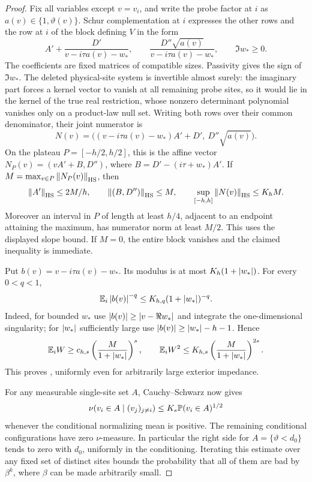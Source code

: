 \begin{proof}
Fix all variables except \(v=v_i\), and write the probe factor at \(i\)
as \(a(v)\in\{1,\vartheta(v)\}\). Schur complementation at \(i\)
expresses the other rows and the row at \(i\) of the block defining \(V\)
in the form
\[
 A'+\frac{D'}{v-i\tau a(v)-w_*},\qquad
 \frac{D''\sqrt{a(v)}}{v-i\tau a(v)-w_*},\qquad \Im w_*\ge0.
\]
The coefficients are fixed matrices of compatible sizes. Passivity
gives the sign of \(\Im w_*\). The deleted physical-site system is
invertible almost surely: the imaginary part forces a kernel vector to
vanish at all remaining probe sites, so it would lie in the kernel of
the true real restriction, whose nonzero determinant polynomial
vanishes only on a product-law null set.
Writing both rows over their common denominator, their joint numerator is
\[
 N(v)=\bigl((v-i\tau a(v)-w_*)A'+D',\ D''\sqrt{a(v)}\bigr).
\]
On the plateau \(P=[-h/2,h/2]\), this is the affine vector
\(N_P(v)=(vA'+B,D'')\), where \(B=D'-(i\tau+w_*)A'\).
If \(M=\max_{v\in P}\left\lVert N_P(v)\right\rVert_{\rm HS}\), then
\[
 \left\lVert A'\right\rVert_{\rm HS}\le2M/h,\qquad
 \left\lVert(B,D'')\right\rVert_{\rm HS}\le M,\qquad
 \sup_{[-h,h]}\left\lVert N(v)\right\rVert_{\rm HS}\le K_hM.
\]
Moreover an interval in \(P\) of length at least \(h/4\), adjacent to
an endpoint attaining the maximum, has numerator norm at least \(M/2\).
This uses the displayed slope bound. If \(M=0\), the entire block
vanishes and the claimed inequality is immediate.

Put \(b(v)=v-i\tau a(v)-w_*\). Its modulus is at most
\(K_h(1+\left\lvert w_*\right\rvert)\). For every \(0<q<1\),
\begin{equation}\label{boot:denominator}
 \mathbb E_i\left\lvert b(v)\right\rvert^{-q}\le K_{h,q}(1+\left\lvert w_*\right\rvert)^{-q}.
\end{equation}
Indeed, for bounded \(w_*\) use
\(\left\lvert b(v)\right\rvert\ge\left\lvert v-\Re w_*\right\rvert\) and integrate the one-dimensional
singularity; for \(\left\lvert w_*\right\rvert\) sufficiently large use
\(\left\lvert b(v)\right\rvert\ge\left\lvert w_*\right\rvert-h-1\). Hence
\[
 \mathbb E_i W\ge c_{h,s}\left(\frac M{1+\left\lvert w_*\right\rvert}\right)^s,
 \qquad
 \mathbb E_i W^2\le K_{h,s}\left(\frac M{1+\left\lvert w_*\right\rvert}\right)^{2s}.
\]
This proves , uniformly even for arbitrarily large
exterior impedance.

For any measurable single-site set \(A\), Cauchy--Schwarz now gives
\[
 \nu(v_i\in A\mid(v_j)_{j\ne i})
       \le K_s\mathbb P(v_i\in A)^{1/2}
\]
whenever the conditional normalizing mean is positive. The remaining
conditional configurations have zero \(\nu\)-measure. In particular
the right side for \(A=\{\vartheta<d_0\}\) tends to zero with \(d_0\),
uniformly in the conditioning. Iterating this estimate over any fixed
set of distinct sites bounds the probability that all of them are bad
by \(\beta^{k}\), where \(\beta\) can be made arbitrarily small.


\end{proof}
